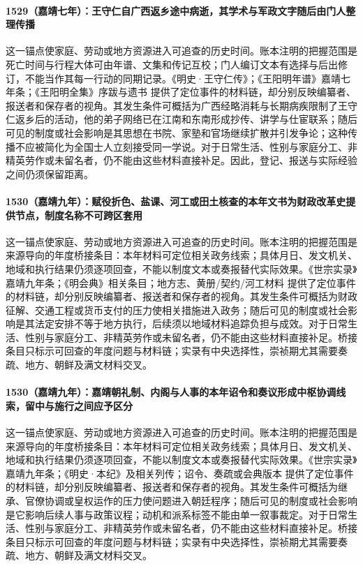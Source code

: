 \paragraph{1529（嘉靖七年）：王守仁自广西返乡途中病逝，其学术与军政文字随后由门人整理传播} 这一锚点使家庭、劳动或地方资源进入可追查的历史时间。账本注明的把握范围是死亡时间与行程大体可由年谱、文集和传记互校；门人编订文本有选择与后出修订，不能当作其每一行动的同期记录。《明史·王守仁传》；《王阳明年谱》嘉靖七年条；《王阳明全集》序跋与遗书 提供了定位事件的材料链，却分别反映编纂者、报送者和保存者的视角。其发生条件可概括为广西经略消耗与长期病疾限制了王守仁返乡后的活动，他的弟子网络已在江南和东南形成抄传、讲学与仕宦联系；随后可见的制度或社会影响是其思想在书院、家塾和官场继续扩散并引发争论；这种传播不应被简化为全国士人立刻接受同一学说。对于日常生活、性别与家庭分工、非精英劳作或未留名者，仍不能由这些材料直接补足。因此，登记、报送与实际经验之间仍须保留距离。

\paragraph{1530（嘉靖九年）：赋役折色、盐课、河工或田土核查的本年文书为财政改革史提供节点，制度名称不可跨区套用} 这一锚点使家庭、劳动或地方资源进入可追查的历史时间。账本注明的把握范围是来源导向的年度桥接条目：本年材料可定位相关政务线索；具体月日、发文机关、地域和执行结果仍须逐项回查，不能以制度文本或奏报替代实际效果。《世宗实录》嘉靖九年条；《明会典》相关条目；地方志、黄册/契约/河工材料 提供了定位事件的材料链，却分别反映编纂者、报送者和保存者的视角。其发生条件可概括为财政征解、交通工程或货币支付的压力使相关措施进入政务；随后可见的制度或社会影响是其法定安排不等于地方执行，后续须以地域材料追踪负担与成效。对于日常生活、性别与家庭分工、非精英劳作或未留名者，仍不能由这些材料直接补足。桥接条目只标示可回查的年度问题与材料链；实录有中央选择性，崇祯期尤其需要奏疏、地方、朝鲜及满文材料交叉。

\paragraph{1530（嘉靖九年）：嘉靖朝礼制、内阁与人事的本年诏令和奏议形成中枢协调线索，留中与施行之间应予区分} 这一锚点使家庭、劳动或地方资源进入可追查的历史时间。账本注明的把握范围是来源导向的年度桥接条目：本年材料可定位相关政务线索；具体月日、发文机关、地域和执行结果仍须逐项回查，不能以制度文本或奏报替代实际效果。《世宗实录》嘉靖九年条；《明史·本纪》及相关列传；诏令、奏疏或会典版本 提供了定位事件的材料链，却分别反映编纂者、报送者和保存者的视角。其发生条件可概括为继承、官僚协调或皇权运作的压力使问题进入朝廷程序；随后可见的制度或社会影响是它影响后续人事与政策议程；动机和派系标签不能由单一叙事裁定。对于日常生活、性别与家庭分工、非精英劳作或未留名者，仍不能由这些材料直接补足。桥接条目只标示可回查的年度问题与材料链；实录有中央选择性，崇祯期尤其需要奏疏、地方、朝鲜及满文材料交叉。

